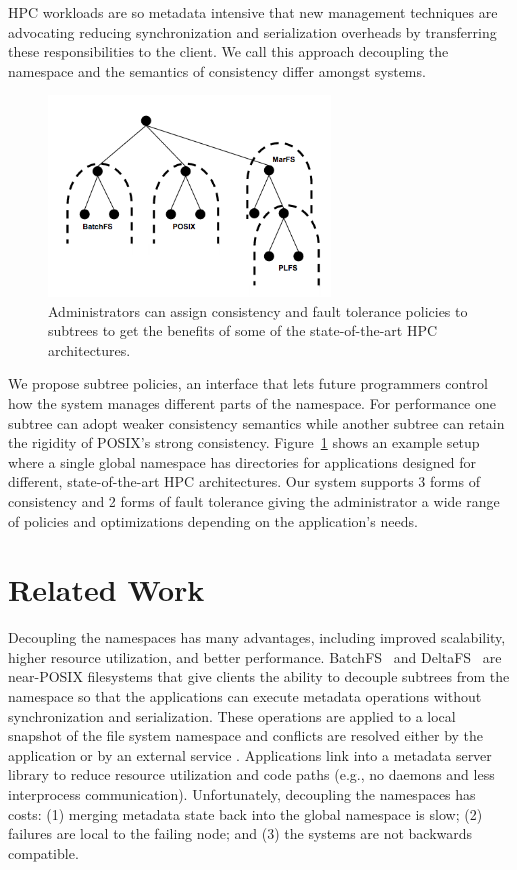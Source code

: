 \documentclass[preprint]{sigplanconf-eurosys}
\begin{document}
HPC workloads are so metadata intensive that new management techniques are
advocating reducing synchronization and serialization overheads by transferring
these responsibilities to the client. We call this approach decoupling the
namespace and the semantics of consistency differ amongst systems.

\begin{figure}[tb]
\centering
\includegraphics[width=75mm]{figures/subtree-policies.png}
\caption{Administrators can assign consistency and fault tolerance policies to
subtrees to get the benefits of some of the state-of-the-art HPC architectures.
}\label{fig:subtree-policies}
\end{figure}

We propose subtree policies, an interface that lets future programmers control
how the system manages different parts of the namespace.  For performance one
subtree can adopt weaker consistency semantics while another subtree can retain
the rigidity of POSIX's strong consistency. Figure~\ref{fig:subtree-policies}
shows an example setup where a single global namespace has directories for
applications designed for different, state-of-the-art HPC architectures.  Our
system supports 3 forms of consistency and 2 forms of fault tolerance giving
the administrator a wide range of policies and optimizations depending on the
application's needs.

\section{Related Work}

Decoupling the namespaces has many advantages, including improved scalability,
higher resource utilization, and better performance.
BatchFS~\cite{zheng:pdsw2014-batchfs} and DeltaFS~\cite{zheng:pdsw2015-deltafs}
are near-POSIX filesystems that give clients the ability to decouple subtrees
from the namespace so that the applications can execute metadata operations
without synchronization and serialization.  These operations are applied to a
local snapshot of the file system namespace and conflicts are resolved either
by the application or by an external service . Applications link into a
metadata server library to reduce resource utilization and code paths (e.g., no
daemons and less interprocess communication). Unfortunately, decoupling the
namespaces has costs: (1) merging metadata state back into the global namespace
is slow; (2) failures are local to the failing node; and (3) the systems are
not backwards compatible. 
\end{document}
